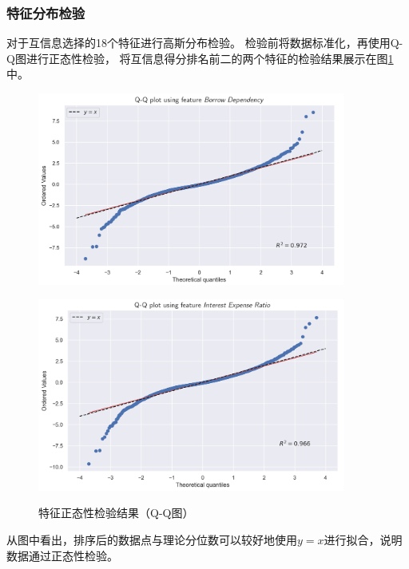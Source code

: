 \subsubsection{特征分布检验}
对于互信息选择的18个特征进行高斯分布检验。
检验前将数据标准化，再使用Q-Q图进行正态性检验，
将互信息得分排名前二的两个特征的检验结果展示在图\ref{fig:qqplot-gaussian}中。
\begin{figure}[ht]
    \centering
    \begin{minipage}[c]{0.45\textwidth}
        \centering
        \includegraphics[width=0.9\textwidth]{images/qqplot_borrow_dependency.png}
        \label{fig:borrow-dependency-qq}
    \end{minipage}
    \begin{minipage}[c]{0.45\textwidth}
        \centering
        \includegraphics[width=0.9\textwidth]{images/qqplot_interest_expense_ratio.png}
        \label{fig:interest-expense-qq}
    \end{minipage}
    \caption{特征正态性检验结果（Q-Q图）}
    \label{fig:qqplot-gaussian}
\end{figure}
从图中看出，排序后的数据点与理论分位数可以较好地使用$y=x$进行拟合，说明
数据通过正态性检验。